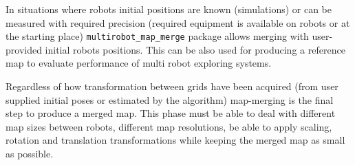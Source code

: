 In situations where robots initial positions are known (simulations) or can be measured with required precision (required equipment is available on robots or at the starting place) \texttt{multirobot\_map\_merge} package allows merging with user-provided initial robots positions. This can be also used for producing a reference map to evaluate performance of multi robot exploring systems.

Regardless of how transformation between grids have been acquired (from user supplied initial poses or estimated by the algorithm) map-merging is the final step to produce a merged map. This phase must be able to deal with different map sizes between robots, different map resolutions, be able to apply scaling, rotation and translation transformations while keeping the merged map as small as possible.


